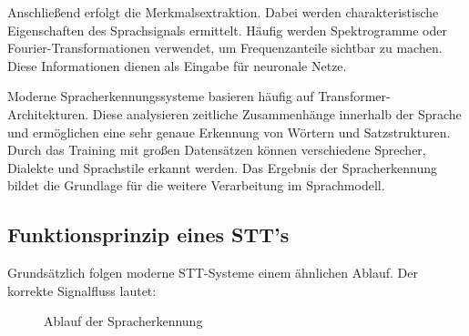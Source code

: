 Anschließend erfolgt die Merkmalsextraktion. Dabei werden charakteristische Eigenschaften des Sprachsignals ermittelt. Häufig werden Spektrogramme oder Fourier-Transformationen verwendet, um Frequenzanteile sichtbar zu machen. Diese Informationen dienen als Eingabe für neuronale Netze. \cite{shen2018tacotron}

Moderne Spracherkennungssysteme basieren häufig auf Transformer-Architekturen. Diese analysieren zeitliche Zusammenhänge innerhalb der Sprache und ermöglichen eine sehr genaue Erkennung von Wörtern und Satzstrukturen. Durch das Training mit großen Datensätzen können verschiedene Sprecher, Dialekte und Sprachstile erkannt werden. Das Ergebnis der Spracherkennung bildet die Grundlage für die weitere Verarbeitung im Sprachmodell.\cite{segal2024whisper} 

\subsection{Funktionsprinzip eines STT's}
Grundsätzlich folgen moderne STT-Systeme einem ähnlichen Ablauf. Der korrekte Signalfluss lautet: 

\begin{figure}[htbp]
	\centering
	
	
	\caption{Ablauf der Spracherkennung}
	\label{fig:spracherkennung}
\end{figure} 

